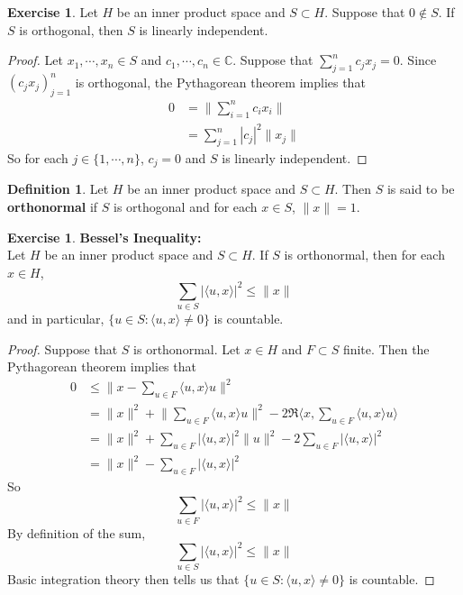 \documentclass[12pt]{amsart}
\theoremstyle{definition}
\newtheorem{defn}[definition]{Definition}
\newtheorem{ex}[definition]{Exercise}
\newcommand{\C}{\mathbb{C}}
\renewcommand{\r}{\rangle}
\renewcommand{\l}{\langle}
\newcommand{\lex}[1]{\label{ex:#1}}
\newcommand{\ld}[1]{\label{defn:#1}}
\begin{document}
\begin{ex} \lex{}
	Let $H$ be an inner product space and $S \subset H$. Suppose that $0 \not \in S$. If $S$ is orthogonal, then $S$ is linearly independent.
\end{ex}

\begin{proof}
	Let $x_1, \cdots, x_n \in S$ and $c_1, \cdots, c_n \in \C$. Suppose that $\sum\limits_{j =1}^n c_j x_j = 0 $. Since $(c_j x_j)_{j=1}^n$ is orthogonal, the Pythagorean theorem implies that 
	\begin{align*}
		0
		&= \bigg \| \sum_{i=1}^n c_i x_i \bigg \| \\
		&= \sum_{j=1}^n  |c_j|^2 \| x_j\| 
	\end{align*}
	So for each $j \in \{ 1 , \cdots, n\}$, $c_j = 0$ and $S$ is linearly independent.
\end{proof}

\begin{defn} \ld{}
	Let $H$ be an inner product space and $S \subset H$. Then $S$ is said to be \textbf{orthonormal} if $S$ is orthogonal and for each $x \in S$, $\|x \| = 1$.
\end{defn}

\begin{ex} \lex{}\textbf{Bessel's Inequality:}\\
Let $H$ be an inner product space and $S \subset H$. If $S$ is orthonormal, then for each $x \in H$, $$\sum_{u \in S} | \l u, x \r |^2  \leq \|x\|$$
and in particular, $\{u \in S: \l u, x\r \neq 0\}$ is countable.
\end{ex}

\begin{proof}
Suppose that $S$ is orthonormal. Let $x \in H$ and $F \subset S$ finite. Then the Pythagorean theorem implies that  
\begin{align*}
0 
& \leq \bigg \|x - \sum_{u \in F} \l u, x \r u \bigg \|^2 \\
&= \|x\|^2 + \bigg \| \sum_{u \in F} \l u, x \r u \bigg \|^2 - 2 \Re \bigg \l x, \sum_{u \in F} \l u, x \r u \bigg \r  \\
&= \|x\|^2 +  \sum_{u \in F} |\l u, x \r|^2 \|u\|^2 - 2 \sum_{u \in F} | \l u, x \r|^2  \\
&= \|x\|^2 -  \sum_{u \in F} |\l u, x \r|^2 
\end{align*}
So $$\sum_{u \in F} | \l u, x \r |^2  \leq \|x\|$$
By definition of the sum, $$\sum_{u \in S} | \l u, x \r |^2  \leq \|x\|$$
Basic integration theory then tells us that $\{u \in S: \l u, x\r \neq 0\}$ is countable.
\end{proof}
\end{document}
